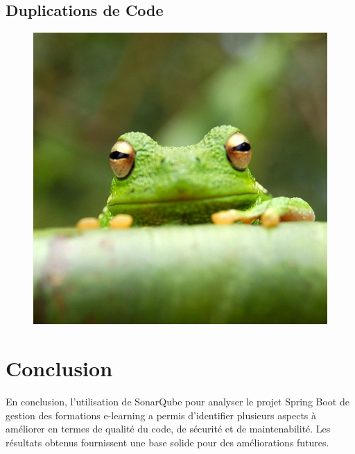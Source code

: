 \documentclass{article}
\begin{document}
\subsection{Duplications de Code}

\begin{figure}[H]
    \centering
    \includegraphics[width=0.5\linewidth]{assets/frog.jpg}
    \end{figure}

\section{Conclusion}

En conclusion, l'utilisation de SonarQube pour analyser le projet Spring Boot de gestion des formations e-learning a permis d'identifier plusieurs aspects à améliorer en termes de qualité du code, de sécurité et de maintenabilité. Les résultats obtenus fournissent une base solide pour des améliorations futures.


\end{document}
